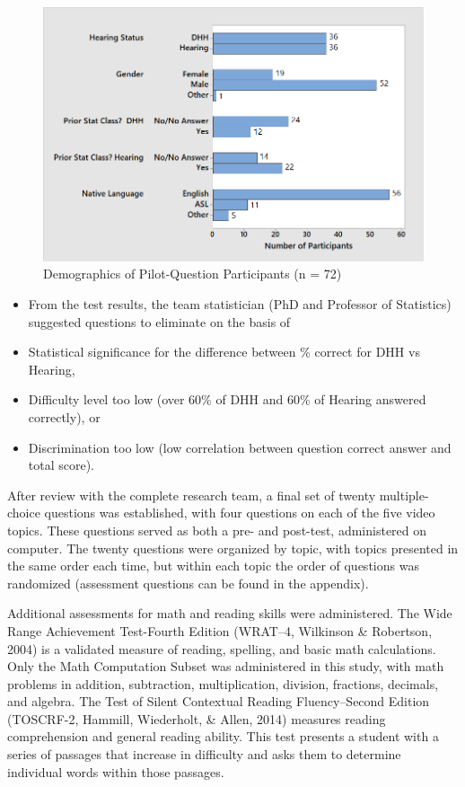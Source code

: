 \documentclass[11.5pt]{sig-alternate} %
\begin{document}
\begin{large}
\begin{figure}[h]
    \centering
    \includegraphics[width=1\linewidth]{Fig_1.png}
    \caption{Demographics of Pilot-Question Participants (n = 72)}
\end{figure}

\begin{itemize}
    \item From the test results, the team statistician (PhD and Professor of Statistics) suggested questions to eliminate on the basis of
    \item Statistical significance for the difference between \% correct for DHH vs Hearing,
    \item Difficulty level too low (over 60\% of DHH and 60\% of Hearing answered correctly), or
    \item Discrimination too low (low correlation between question correct answer and total score).
\end{itemize}

After review with the complete research team, a final set of twenty multiple-choice questions was established, with four questions on each of the five video topics. These questions served as both a pre- and post-test, administered on computer. The twenty questions were organized by topic, with topics presented in the same order each time, but within each topic the order of questions was randomized (assessment questions can be found in the appendix).

Additional assessments for math and reading skills were administered. The Wide Range Achievement Test-Fourth Edition (WRAT–4, Wilkinson \& Robertson, 2004) is a validated measure of reading, spelling, and basic math calculations. Only the Math Computation Subset was administered in this study, with math problems in addition, subtraction, multiplication, division, fractions, decimals, and algebra. The Test of Silent Contextual Reading Fluency–Second Edition (TOSCRF-2, Hammill, Wiederholt, \& Allen, 2014) measures reading comprehension and general reading ability. This test presents a student with a series of passages that increase in difficulty and asks them to determine individual words within those passages.


\end{large}
\end{document}
